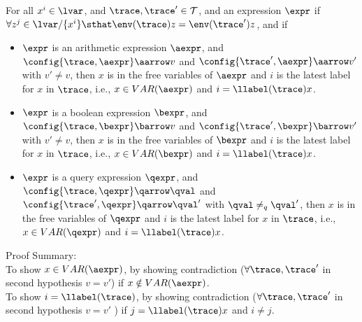\begin{lem}
	\label{lem:inv_expr}
	For all {$ x^i \in \lvar$, and $\trace, \trace' \in \mathcal{T}$, and an expression $\expr$} if
	$ \forall z^j \in \lvar / \{x^i\} \sthat  
	\env(\trace) z = \env(\trace') z $, and if
	\begin{itemize}
		\item $\expr$ is an arithmetic expression $\aexpr$,
		and $\config{\trace, \aexpr} \aarrow v $ and 
	$\config{\trace', \aexpr} \aarrow v' $ with $v' \neq v$, 
	then $ x $ is in the free variables of $\aexpr$ and $i$ is the latest label for $x$ 
    in $\trace$, i.e., $x \in VAR(\aexpr)$ and $i = \llabel(\trace) x$.
%
	\item $\expr$ is a boolean expression $\bexpr$,
  and $\config{\trace, \bexpr} \barrow v $ and 
 $\config{\trace', \bexpr} \barrow v' $ with $v' \neq v$, then $ x $ is in the free variables of $\bexpr$ and $i$ is the latest label for $x$ 
 in $\trace$, i.e., $x \in VAR(\bexpr)$ and $i = \llabel(\trace) x$.
% 
	\item $\expr$ is a query expression $\qexpr$,
	and $\config{\trace, \qexpr} \qarrow \qval $ and 
	$\config{\trace', \qexpr} \qarrow \qval' $ with $\qval \neq_{q} \qval'$, then $ x $ is in the free variables of $\qexpr$ and $i$ is the latest label for $x$ 
    in $\trace$, i.e., $x \in VAR(\qexpr)$ and $i = \llabel(\trace) x$.
\end{itemize}	%
	\end{lem}
    Proof Summary:
    \\
    To show $x \in VAR(\aexpr)$, by showing contradiction ($\forall \trace, \trace'$ in second hypothesis  $v = v'$)
     if $x \notin VAR(\aexpr)$.
     \\
    To show $i = \llabel(\trace)$, by showing contradiction ($\forall \trace, \trace'$ in second hypothesis  $v = v'$ ) 
    if $j = \llabel(\trace) x$ and $i \neq j$.
